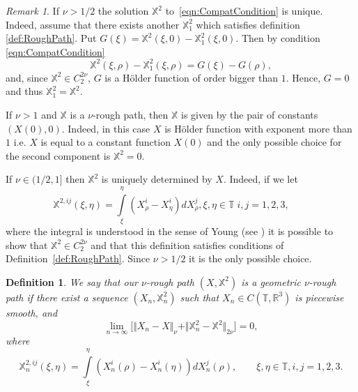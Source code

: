 \documentclass[11pt,a4paper,reqno]{amsart}%
\theoremstyle{plain}
\theoremstyle{remark}
\newtheorem{remark}[theorem]{Remark}
\theoremstyle{plain}
\newtheorem{definition}[theorem]{Definition}
\numberwithin{equation}{section}
\def\Rnu{{\mathbb R}}
\def\intl{\int\limits}
\begin{document}
\begin{remark}
If $\nu>1/2$ the solution $\mathbb{X}^{2}$ to~\eqref{eqn:CompatCondition} is unique. Indeed, assume that there exists another
$\mathbb{X}_1^{2}$ which satisfies definition \ref{def:RoughPath}.
Put $G(\xi)=\mathbb{X}^{2}(\xi,0)-\mathbb{X}_1^{2}(\xi,0)$. Then
by condition \eqref{eqn:CompatCondition}
$$
\mathbb{X}^{2}(\xi,\rho)-\mathbb{X}_1^{2}(\xi,\rho)=G(\xi)-G(\rho),
$$
and, since $\mathbb{X}^{2}\in C_2^{2\nu}$, $G$ is a H\"{o}lder
function of order bigger  than $1$. Hence,  $G=0$ and thus 
$\mathbb{X}_1^{2}=\mathbb{X}^{2}$.

If $\nu>1$ and $\mathbb{X}$ is a $\nu$-rough path, then
$\mathbb{X}$ is given by the pair of constants $(X(0),0)$. Indeed,
in this case $X$ is H\"older function with exponent more than $1$
i.e. $X$ is equal to a constant function  $X(0)$ and the only possible choice for the second component is $\mathbb{X}^{2}=0$.

If $\nu\in({1}/{2},1]$ then $\mathbb{X}^2$ is
uniquely determined by $X$. Indeed, if we let
\begin{equation}
\mathbb{X}^{2,ij}(\xi,\eta)=\intl_{\xi}^{\eta}(X^i_{\rho}-X^i_{\eta})dX^j_{\rho},\xi,\eta\in
\mathbb{T}\; i,j=1,2,3, \qquad\label{eqn:YoungIntegralCase}
\end{equation}
where the integral is understood in the sense of Young (see
\cite{[Young-1936]}) it is possible to show that $\mathbb{X}^{2}\in C^{2\nu}_2$  and that this definition satisfies conditions of
Definition~\ref{def:RoughPath}. Since $\nu > 1/2$ it is the only possible choice.
\end{remark}
\begin{definition}\label{ass:RoughPathApproximability}
We say that our $\nu$-rough path $(X,\mathbb{X}^2)$  is a
geometric $\nu$-rough path if there exist a sequence
$(X_n,\mathbb{X}_n^2)$ such that
$
X_n\in C(\mathbb{T},\Rnu^3)
$ is piecewise smooth, and 
\begin{equation}
\lim_{n\to\infty}\big[\Vert X_n-X\Vert_{\nu}+\Vert \mathbb{X}_n^2-\mathbb{X}^2\Vert_{2\nu}\big]=
0,\label{eqn:RoughPathTopology}
\end{equation}
where
$$
\mathbb{X}_n^{2,ij}(\xi,\eta)=\intl_{\xi}^{\eta}(X_n^i({\rho})-X_n^i({\eta}))dX_n^j({\rho}),\qquad \xi,\eta\in
\mathbb{T},i,j=1,2,3.
$$
\end{definition}
\end{document}
